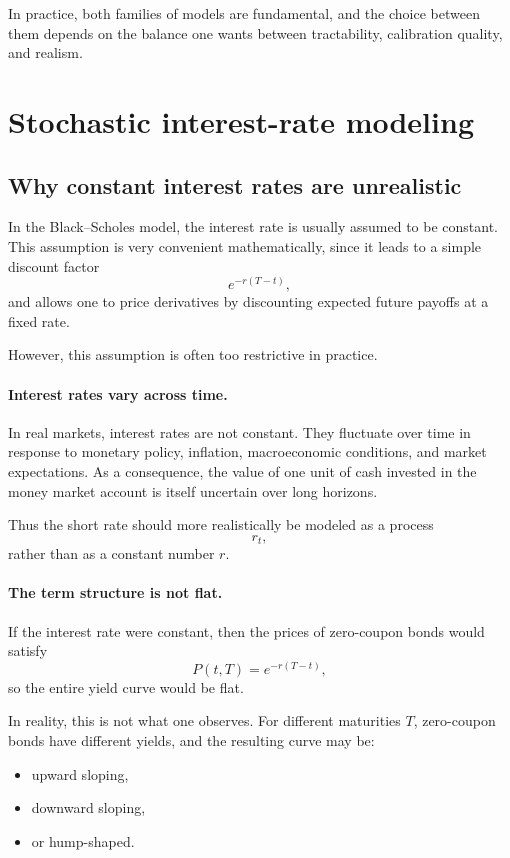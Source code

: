 \documentclass[11pt]{article}
\theoremstyle{plain}
\theoremstyle{definition}
\theoremstyle{remark}
\begin{document}
In practice, both families of models are fundamental, and the choice
between them depends on the balance one wants between tractability,
calibration quality, and realism.

\section{Stochastic interest-rate modeling}

\subsection{Why constant interest rates are unrealistic}

In the Black--Scholes model, the interest rate is usually assumed to be
constant.
This assumption is very convenient mathematically, since it leads to a
simple discount factor
\[
e^{-r(T-t)},
\]
and allows one to price derivatives by discounting expected future
payoffs at a fixed rate.

However, this assumption is often too restrictive in practice.

\paragraph{Interest rates vary across time.}

In real markets, interest rates are not constant.
They fluctuate over time in response to monetary policy, inflation,
macroeconomic conditions, and market expectations.
As a consequence, the value of one unit of cash invested in the money
market account is itself uncertain over long horizons.

Thus the short rate should more realistically be modeled as a process
\[
r_t,
\]
rather than as a constant number \(r\).

\paragraph{The term structure is not flat.}

If the interest rate were constant, then the prices of zero-coupon bonds
would satisfy
\[
P(t,T)=e^{-r(T-t)},
\]
so the entire yield curve would be flat.

In reality, this is not what one observes.
For different maturities \(T\), zero-coupon bonds have different yields,
and the resulting curve may be:
\begin{itemize}[leftmargin=1.4em]
    \item upward sloping,
    \item downward sloping,
    \item or hump-shaped.
\end{itemize}
\end{document}
